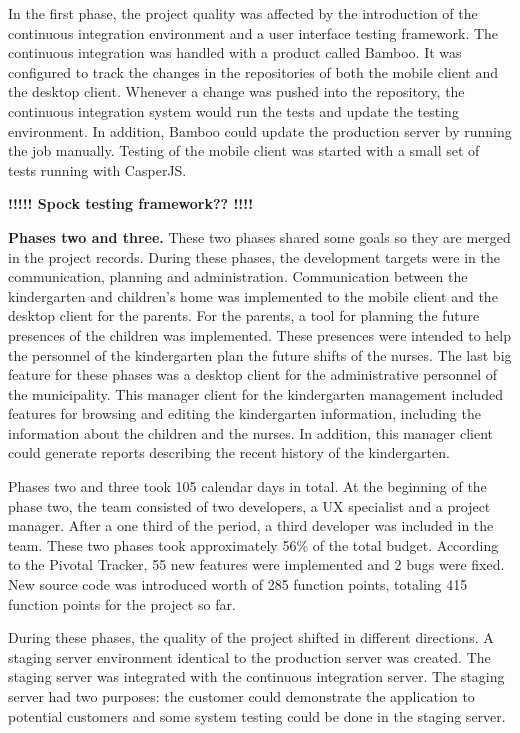In the first phase, the project quality was affected by the introduction of the continuous integration environment and a user interface testing framework. 
The continuous integration was handled with a product called Bamboo. It was configured to track the changes in the repositories of both the mobile client and the desktop client. Whenever a change was pushed into the repository, the continuous integration system would run the tests and update the testing environment. In addition, Bamboo could update the production server by running the job manually. Testing of the mobile client was started with a small set of tests running with CasperJS.

\textbf{!!!!! Spock testing framework?? !!!!}

\textbf{Phases two and three.} These two phases shared some goals so they are merged in the project records. During these phases, the development targets were in the communication, planning and administration. Communication between the kindergarten and children's home was implemented to the mobile client and the desktop client for the parents. For the parents, a tool for planning the future presences of the children was implemented. These presences were intended to help the personnel of the kindergarten plan the future shifts of the nurses. The last big feature for these phases was a desktop client for the administrative personnel of the municipality. This manager client for the kindergarten management included features for browsing and editing the kindergarten information, including the information about the children and the nurses. In addition, this manager client could generate reports describing the recent history of the kindergarten.

Phases two and three took 105 calendar days in total. At the beginning of the phase two, the team consisted of two developers, a UX specialist and a project manager. After a one third of the period, a third developer was included in the team. These two phases took approximately 56\% of the total budget. According to the Pivotal Tracker, 55 new features were implemented and 2 bugs were fixed. New source code was introduced worth of 285 function points, totaling 415 function points for the project so far.

During these phases, the quality of the project shifted in different directions. A staging server environment identical to the production server was created. The staging server was integrated with the continuous integration server. The staging server had two purposes: the customer could demonstrate the application to potential customers and some system testing could be done in the staging server.

